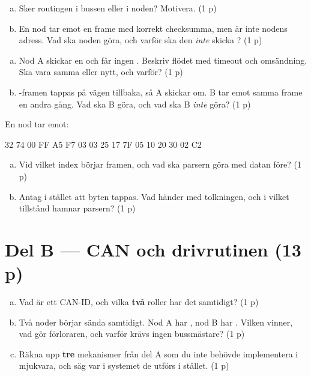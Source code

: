 \label{ex:d:3}
\begin{enumerate}[a)]
  \item Sker routingen i bussen eller i noden? Motivera. (1 p)
  \item En nod tar emot en frame med korrekt checksumma, men  är inte nodens adress.
    Vad ska noden göra, och varför ska den \emph{inte} skicka ? (1 p)
\end{enumerate}

\label{ex:d:4}
\begin{enumerate}[a)]
  \item Nod A skickar en  och får ingen . Beskriv flödet med timeout
    och omsändning. Ska  vara samma eller nytt, och varför? (1 p)
  \item {}-framen tappas på vägen tillbaka, så A skickar om. B tar emot samma frame en
    andra gång. Vad ska B göra, och vad ska B \emph{inte} göra? (1 p)
\end{enumerate}

\label{ex:d:5}
En nod tar emot:
\begin{console}
32 74 00 FF A5 F7 03 03 25 17 7F 05 10 20 30 02 C2
\end{console}
\begin{enumerate}[a)]
  \item Vid vilket index börjar framen, och vad ska parsern göra med datan före? (1 p)
  \item Antag i stället att byten  tappas. Vad händer med tolkningen, och i vilket
    tillstånd hamnar parsern? (1 p)
\end{enumerate}

\section*{Del B --- CAN och drivrutinen (13 p)}

\label{ex:d:6}
\begin{enumerate}[a)]
  \item Vad är ett CAN-ID, och vilka \textbf{två} roller har det samtidigt? (1 p)
  \item Två noder börjar sända samtidigt. Nod A har , nod B har . Vilken
    vinner, vad gör förloraren, och varför krävs ingen bussmästare? (1 p)
  \item Räkna upp \textbf{tre} mekanismer från del A som du inte behövde implementera i mjukvara,
    och säg var i systemet de utförs i stället. (1 p)
\end{enumerate}

